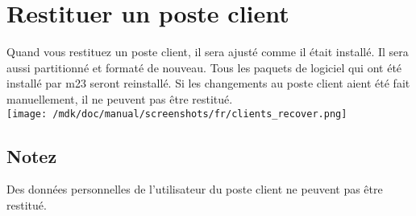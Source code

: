 \section{Restituer un poste client}Quand vous restituez un poste client, il sera ajust\'e comme il \'etait install\'e. Il sera aussi partitionn\'e et format\'e de nouveau. Tous les paquets de logiciel qui ont \'et\'e install\'e par m23 seront reinstall\'e. Si les changements au poste client aient \'et\'e fait manuellement, il ne peuvent pas \^etre restitu\'e.\\
\texttt{[image: /mdk/doc/manual/screenshots/fr/clients\_recover.png]} \\
\subsection{Notez}
Des donn\'ees personnelles de l'utilisateur du poste client ne peuvent pas \^etre restitu\'e.\\
